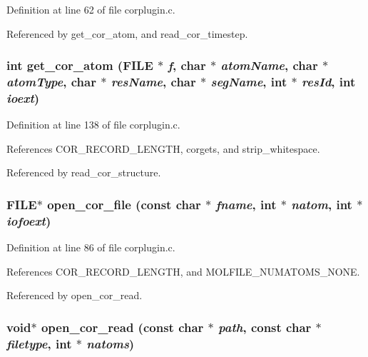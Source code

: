 Definition at line 62 of file corplugin.c.

Referenced by get\_\-cor\_\-atom, and read\_\-cor\_\-timestep.
\subsubsection{\setlength{\rightskip}{0pt plus 5cm}int get\_\-cor\_\-atom (FILE $\ast$ {\em f}, char $\ast$ {\em atom\-Name}, char $\ast$ {\em atom\-Type}, char $\ast$ {\em res\-Name}, char $\ast$ {\em seg\-Name}, int $\ast$ {\em res\-Id}, int {\em ioext})\hspace{0.3cm}{\tt  [static]}}\label{corplugin_8c_a5}




Definition at line 138 of file corplugin.c.

References COR\_\-RECORD\_\-LENGTH, corgets, and strip\_\-whitespace.

Referenced by read\_\-cor\_\-structure.
\subsubsection{\setlength{\rightskip}{0pt plus 5cm}FILE$\ast$ open\_\-cor\_\-file (const char $\ast$ {\em fname}, int $\ast$ {\em natom}, int $\ast$ {\em iofoext})\hspace{0.3cm}{\tt  [static]}}\label{corplugin_8c_a4}




Definition at line 86 of file corplugin.c.

References COR\_\-RECORD\_\-LENGTH, and MOLFILE\_\-NUMATOMS\_\-NONE.

Referenced by open\_\-cor\_\-read.
\subsubsection{\setlength{\rightskip}{0pt plus 5cm}void$\ast$ open\_\-cor\_\-read (const char $\ast$ {\em path}, const char $\ast$ {\em filetype}, int $\ast$ {\em natoms})\hspace{0.3cm}{\tt  [static]}}\label{corplugin_8c_a6}




